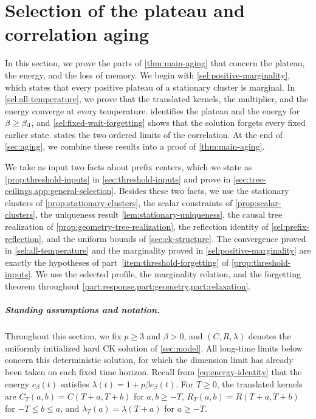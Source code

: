 \chapter{Selection of the plateau and correlation aging}\label{sec:stationary-selection}

In this section, we prove the parts of \cref{thm:main-aging} that concern the plateau, the energy, and the loss of memory. We begin with \cref{sel:positive-marginality}, which states that every positive plateau of a stationary cluster is marginal. In \cref{sel:all-temperature}, we prove that the translated kernels, the multiplier, and the energy converge at every temperature.  identifies the plateau and the energy for $\beta\ge\beta_{\mathrm d}$, and \cref{sel:fixed-wait-forgetting} shows that the solution forgets every fixed earlier state.  states the two ordered limits of the correlation. At the end of \cref{sec:aging}, we combine these results into a proof of \cref{thm:main-aging}.

We take as input two facts about prefix centers, which we state as \cref{prop:threshold-inputs} in \cref{sec:threshold-inputs} and prove in \cref{sec:tree-ceilings,app:general-selection}. Besides these two facts, we use the stationary clusters of \cref{prop:stationary-clusters}, the scalar constraints of \cref{prop:scalar-clusters}, the uniqueness result \cref{lem:stationary-uniqueness}, the causal tree realization of \cref{prop:geometry-tree-realization}, the reflection identity of \cref{sel:prefix-reflection}, and the uniform bounds of \cref{sec:ck-structure}. The convergence proved in \cref{sel:all-temperature} and the marginality proved in \cref{sel:positive-marginality} are exactly the hypotheses of part~\ref{item:threshold-forgetting} of \cref{prop:threshold-inputs}. We use the selected profile, the marginality relation, and the forgetting theorem throughout \cref{part:response,part:geometry,part:relaxation}.

\paragraph{Standing assumptions and notation.}
Throughout this section, we fix $p\ge3$ and $\beta>0$, and $(C,R,\lambda)$ denotes the uniformly initialized hard CK solution of \cref{sec:model}. All long-time limits below concern this deterministic solution, for which the dimension limit has already been taken on each fixed time horizon. Recall from \eqref{eq:energy-identity} that the energy $e_\beta(t)$ satisfies $\lambda(t)=1+p\beta e_\beta(t)$. For $T\ge0$, the translated kernels are $C_T(a,b)=C(T+a,T+b)$ for $a,b\ge-T$, $R_T(a,b)=R(T+a,T+b)$ for $-T\le b\le a$, and $\lambda_T(a)=\lambda(T+a)$ for $a\ge-T$.

